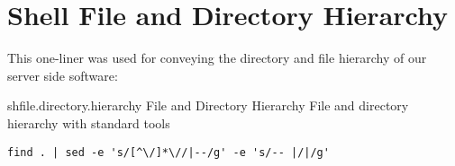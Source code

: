 \section{Shell File and Directory Hierarchy}
\label{section:source.code.hierarchy}

This one-liner was used for conveying the directory and file hierarchy of our
server side software:

\begin{scode}{sh}{file.directory.hierarchy}{%
   File and Directory Hierarchy}{%
  File and directory hierarchy with standard  tools}
\begin{lstlisting}
find . | sed -e 's/[^\/]*\//|--/g' -e 's/-- |/|/g'
\end{lstlisting}
\end{scode}


